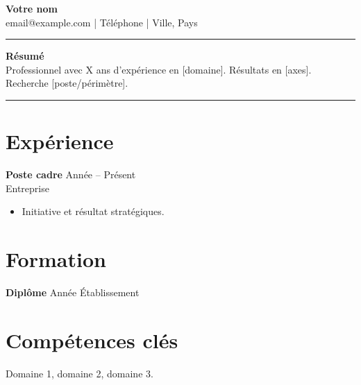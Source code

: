 \documentclass[11pt,a4paper]{article}
\begin{document}
\begin{center}
{\LARGE \textbf{Votre nom}}\\[0.2em]
email@example.com \quad | \quad Téléphone \quad | \quad Ville, Pays
\end{center}
\begin{flushright}\rule{2cm}{2.5cm}\end{flushright}
\vspace{0.4em}
\noindent\textbf{Résumé}\\
Professionnel avec X ans d'expérience en [domaine]. Résultats en [axes]. Recherche [poste/périmètre].

\vspace{0.5em}
\noindent\rule{\textwidth}{0.4pt}
\section*{Expérience}
\textbf{Poste cadre} \hfill Année -- Présent \\
Entreprise \\
\begin{itemize}
  \item Initiative et résultat stratégiques.
\end{itemize}
\section*{Formation}
\textbf{Diplôme} \hfill Année \quad Établissement
\section*{Compétences clés}
Domaine 1, domaine 2, domaine 3.
\end{document}
